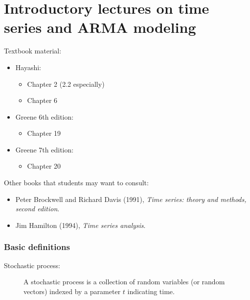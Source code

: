 

\part*{Introductory lectures on time series and ARMA modeling}

Textbook material:
\begin{itemize}
\item Hayashi:
  \begin{itemize}
  \item Chapter 2 (2.2 especially)
  \item Chapter 6
  \end{itemize}
\item Greene 6th edition:
  \begin{itemize}
  \item Chapter 19
  \end{itemize}
\item Greene 7th edition:
  \begin{itemize}
  \item Chapter 20
  \end{itemize}
\end{itemize}

Other books that students may want to consult:
\begin{itemize}
\item Peter Brockwell and Richard Davis (1991), \emph{Time series:
    theory and methods, second edition}.
\item Jim Hamilton (1994), \emph{Time series analysis}.
\end{itemize}

\section{Basic definitions}

\begin{description}
\item[Stochastic process:]
A stochastic process is a collection of random variables (or
random vectors) indexed by a parameter $t$ indicating time.
\end{description}

